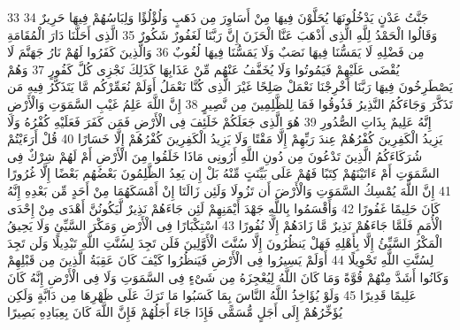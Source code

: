 \documentclass[20pt,a4paper]{article}
\begin{document}
{\tiny\colorbox{cl_aya}{33}} جَنَّتُ عَدْنٍ يَدْخُلُونَهَا يُحَلَّوْنَ فِيهَا مِنْ أَسَاوِرَ مِن ذَهَبٍ وَلُؤْلُؤًا وَلِبَاسُهُمْ فِيهَا حَرِيرٌ
{\tiny\colorbox{cl_aya}{34}} وَقَالُوا الْحَمْدُ لِلَّهِ الَّذِى أَذْهَبَ عَنَّا الْحَزَنَ إِنَّ رَبَّنَا لَغَفُورٌ شَكُورٌ
{\tiny\colorbox{cl_aya}{35}} الَّذِى أَحَلَّنَا دَارَ الْمُقَامَةِ مِن فَضْلِهِ لَا يَمَسُّنَا فِيهَا نَصَبٌ وَلَا يَمَسُّنَا فِيهَا لُغُوبٌ
{\tiny\colorbox{cl_aya}{36}} وَالَّذِينَ كَفَرُوا لَهُمْ نَارُ جَهَنَّمَ لَا يُقْضَى عَلَيْهِمْ فَيَمُوتُوا وَلَا يُخَفَّفُ عَنْهُم مِّنْ عَذَابِهَا كَذَلِكَ نَجْزِى كُلَّ كَفُورٍ
{\tiny\colorbox{cl_aya}{37}} وَهُمْ يَصْطَرِخُونَ فِيهَا رَبَّنَا أَخْرِجْنَا نَعْمَلْ صَلِحًا غَيْرَ الَّذِى كُنَّا نَعْمَلُ أَوَلَمْ نُعَمِّرْكُم مَّا يَتَذَكَّرُ فِيهِ مَن تَذَكَّرَ وَجَاءَكُمُ النَّذِيرُ فَذُوقُوا فَمَا لِلظَّلِمِينَ مِن نَّصِيرٍ
{\tiny\colorbox{cl_aya}{38}} إِنَّ اللَّهَ عَلِمُ غَيْبِ السَّمَوَتِ وَالْأَرْضِ إِنَّهُ عَلِيمٌ بِذَاتِ الصُّدُورِ
{\tiny\colorbox{cl_aya}{39}} هُوَ الَّذِى جَعَلَكُمْ خَلَئِفَ فِى الْأَرْضِ فَمَن كَفَرَ فَعَلَيْهِ كُفْرُهُ وَلَا يَزِيدُ الْكَفِرِينَ كُفْرُهُمْ عِندَ رَبِّهِمْ إِلَّا مَقْتًا وَلَا يَزِيدُ الْكَفِرِينَ كُفْرُهُمْ إِلَّا خَسَارًا
{\tiny\colorbox{cl_aya}{40}} قُلْ أَرَءَيْتُمْ شُرَكَاءَكُمُ الَّذِينَ تَدْعُونَ مِن دُونِ اللَّهِ أَرُونِى مَاذَا خَلَقُوا مِنَ الْأَرْضِ أَمْ لَهُمْ شِرْكٌ فِى السَّمَوَتِ أَمْ ءَاتَيْنَهُمْ كِتَبًا فَهُمْ عَلَى بَيِّنَتٍ مِّنْهُ بَلْ إِن يَعِدُ الظَّلِمُونَ بَعْضُهُم بَعْضًا إِلَّا غُرُورًا
{\tiny\colorbox{cl_aya}{41}} إِنَّ اللَّهَ يُمْسِكُ السَّمَوَتِ وَالْأَرْضَ أَن تَزُولَا وَلَئِن زَالَتَا إِنْ أَمْسَكَهُمَا مِنْ أَحَدٍ مِّن بَعْدِهِ إِنَّهُ كَانَ حَلِيمًا غَفُورًا
{\tiny\colorbox{cl_aya}{42}} وَأَقْسَمُوا بِاللَّهِ جَهْدَ أَيْمَنِهِمْ لَئِن جَاءَهُمْ نَذِيرٌ لَّيَكُونُنَّ أَهْدَى مِنْ إِحْدَى الْأُمَمِ فَلَمَّا جَاءَهُمْ نَذِيرٌ مَّا زَادَهُمْ إِلَّا نُفُورًا
{\tiny\colorbox{cl_aya}{43}} اسْتِكْبَارًا فِى الْأَرْضِ وَمَكْرَ السَّيِّئِ وَلَا يَحِيقُ الْمَكْرُ السَّيِّئُ إِلَّا بِأَهْلِهِ فَهَلْ يَنظُرُونَ إِلَّا سُنَّتَ الْأَوَّلِينَ فَلَن تَجِدَ لِسُنَّتِ اللَّهِ تَبْدِيلًا وَلَن تَجِدَ لِسُنَّتِ اللَّهِ تَحْوِيلًا
{\tiny\colorbox{cl_aya}{44}} أَوَلَمْ يَسِيرُوا فِى الْأَرْضِ فَيَنظُرُوا كَيْفَ كَانَ عَقِبَةُ الَّذِينَ مِن قَبْلِهِمْ وَكَانُوا أَشَدَّ مِنْهُمْ قُوَّةً وَمَا كَانَ اللَّهُ لِيُعْجِزَهُ مِن شَىْءٍ فِى السَّمَوَتِ وَلَا فِى الْأَرْضِ إِنَّهُ كَانَ عَلِيمًا قَدِيرًا
{\tiny\colorbox{cl_aya}{45}} وَلَوْ يُؤَاخِذُ اللَّهُ النَّاسَ بِمَا كَسَبُوا مَا تَرَكَ عَلَى ظَهْرِهَا مِن دَابَّةٍ وَلَكِن يُؤَخِّرُهُمْ إِلَى أَجَلٍ مُّسَمًّى فَإِذَا جَاءَ أَجَلُهُمْ فَإِنَّ اللَّهَ كَانَ بِعِبَادِهِ بَصِيرًا
\end{document}

